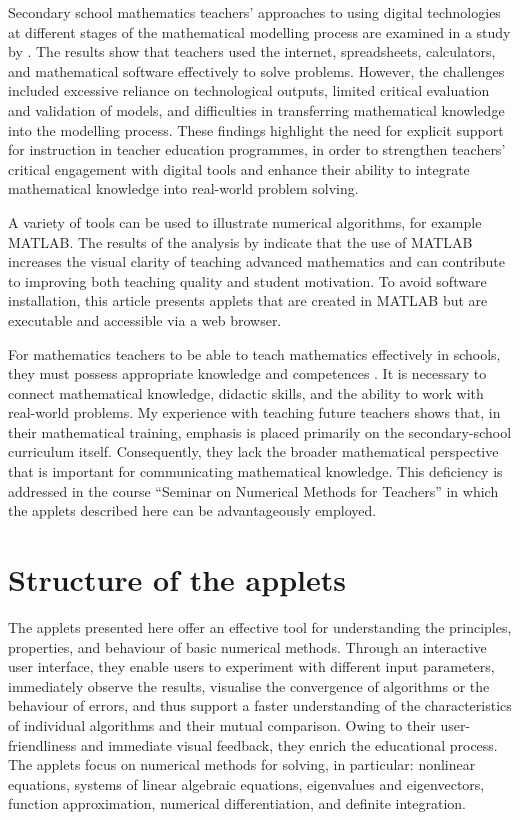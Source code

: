 \documentclass[a4paper,12pt]{article}
\begin{document}
Secondary school mathematics teachers' approaches to using digital technologies at different stages 
of the mathematical modelling process are examined in a study by 
\cite{Kandemir2025}. 
The results show that teachers used the internet, spreadsheets, calculators, and mathematical software effectively to solve problems. However, the challenges included excessive reliance on technological outputs, limited critical evaluation and validation of models, and difficulties in transferring mathematical knowledge into the modelling process. These findings highlight the need for explicit support for instruction in teacher education programmes, in order to strengthen teachers' critical engagement with digital tools and enhance their ability to integrate mathematical knowledge into real-world problem solving.

A variety of tools can be used to illustrate numerical algorithms, for example MATLAB. 
The results of the analysis by \cite{Wang2024} 
indicate that the use of MATLAB increases the visual clarity of teaching advanced mathematics and can contribute to improving both teaching quality and student motivation. 
To avoid software installation, this article presents applets that are created in MATLAB but are executable and accessible via a web browser.

For mathematics teachers to be able to teach mathematics effectively in schools, they must possess
 appropriate knowledge and competences \cite{Guerrero-Ortiz2021}.  
 It is necessary to connect mathematical knowledge, didactic skills, and the ability to work with real-world problems. My experience with teaching future teachers shows that, in their mathematical training, emphasis is placed primarily on the secondary-school curriculum itself. Consequently, they lack the broader mathematical perspective that is important for communicating mathematical knowledge. This deficiency is addressed in the course ``Seminar on Numerical Methods for Teachers'' in which the applets described here can be advantageously employed.

\section{Structure of the applets}\label{sec:structureoftheapplets}
The applets presented here offer an effective tool for understanding the principles, properties, and behaviour of basic numerical methods. Through an interactive user interface, they enable users to experiment with different input parameters, immediately observe the results, visualise the convergence of algorithms or the behaviour of errors, and thus support a faster understanding of the characteristics of individual algorithms and their mutual comparison. Owing to their user-friendliness and immediate visual feedback, they enrich the educational process.  
%
The applets focus on numerical methods for solving, in particular: nonlinear equations, systems of linear algebraic equations, eigenvalues and eigenvectors, function approximation, numerical differentiation, and definite integration.
\end{document}
